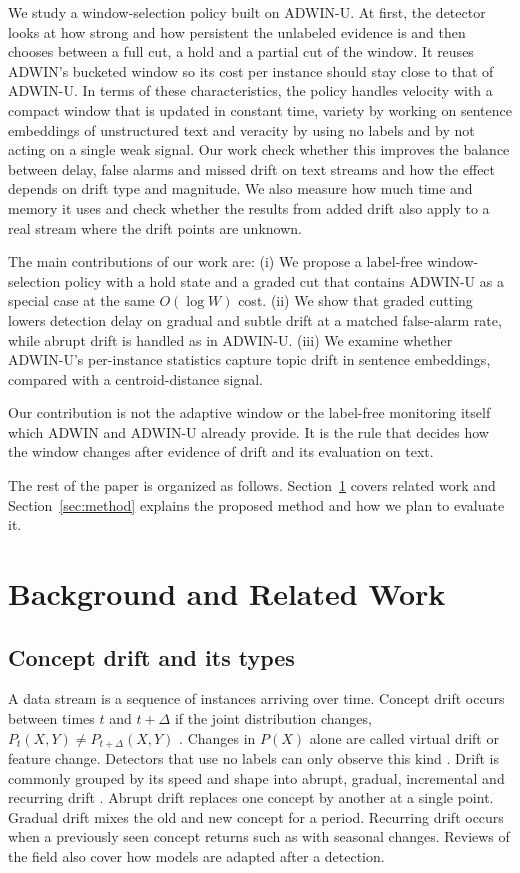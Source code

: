 \documentclass[conference]{IEEEtran}
\begin{document}
We study a window-selection policy built on ADWIN-U. At first, the detector looks at how strong and how persistent the unlabeled evidence is and then chooses between a full cut, a hold and a partial cut of the window. It reuses ADWIN's bucketed window so its cost per instance should stay close to that of ADWIN-U. In terms of these characteristics, the policy handles velocity with a compact window that is updated in constant time, variety by working on sentence embeddings of unstructured text and veracity by using no labels and by not acting on a single weak signal. Our work check whether this improves the balance between delay, false alarms and missed drift on text streams and how the effect depends on drift type and magnitude. We also measure how much time and memory it uses and check whether the results from added drift also apply to a real stream where the drift points are unknown.

The main contributions of our work are:
(i) We propose a label-free window-selection policy with a hold state and a graded cut that contains ADWIN-U as a special case at the same $O(\log W)$ cost.
(ii) We show that graded cutting lowers detection delay on gradual and subtle drift at a matched false-alarm rate, while abrupt drift is handled as in ADWIN-U.
(iii) We examine whether ADWIN-U's per-instance statistics capture topic drift in sentence embeddings, compared with a centroid-distance signal.


Our contribution is not the adaptive window or the label-free monitoring itself which ADWIN and ADWIN-U already provide. It is the rule that decides how the window changes after evidence of drift and its evaluation on text.

The rest of the paper is organized as follows. Section~\ref{sec:related} covers related work and Section~\ref{sec:method} explains the proposed method and how we plan to evaluate it.

\section{Background and Related Work}
\label{sec:related}

\subsection{Concept drift and its types}

A data stream is a sequence of instances arriving over time. Concept drift occurs between times $t$ and $t+\Delta$ if the joint distribution changes, $P_t(X,Y)\neq P_{t+\Delta}(X,Y)$ \cite{gama2014}. Changes in $P(X)$ alone are called virtual drift or feature change. Detectors that use no labels can only observe this kind \cite{assis2025}. Drift is commonly grouped by its speed and shape into abrupt, gradual, incremental and recurring drift \cite{webb2016,suarez2023}. Abrupt drift replaces one concept by another at a single point. Gradual drift mixes the old and new concept for a period. Recurring drift occurs when a previously seen concept returns such as with seasonal changes. Reviews of the field \cite{gama2014,lu2019} also cover how models are adapted after a detection.
\end{document}
